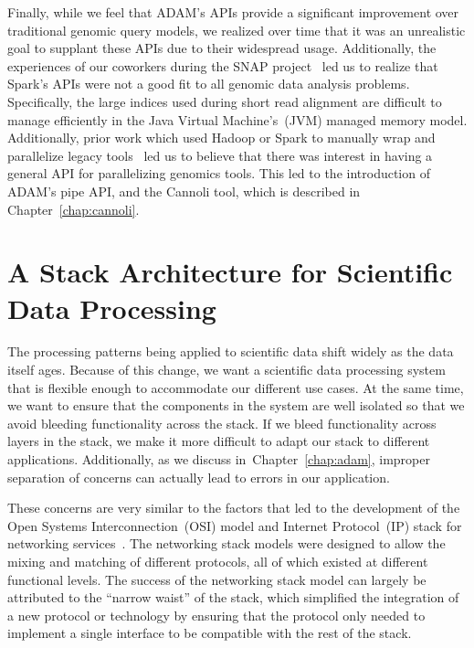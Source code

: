 \documentclass[phd]{ucbthesis}
\begin{document}
Finally, while we feel that {ADAM}'s APIs provide a significant
improvement over traditional genomic query models, we realized over time that it
was an unrealistic goal to supplant these APIs due to their widespread usage.
Additionally, the experiences of our coworkers during the {SNAP}
project~\cite{zaharia11} led us to realize that {Spark}'s APIs were not
a good fit to all genomic data analysis problems. Specifically, the large
indices used during short read alignment are difficult to manage efficiently in
the Java Virtual Machine's~(JVM) managed memory model. Additionally, prior
work which used {Hadoop} or {Spark} to manually wrap and
parallelize legacy tools~\cite{schatz09, langmead09crossbow, abuin15, abuin16,
  chen15, chen16} led us to believe that there was interest in having a general
API for parallelizing genomics tools. This led to the introduction of ADAM's
{pipe} API, and the {Cannoli} tool, which is described in
Chapter~\ref{chap:cannoli}.

\section{A Stack Architecture for Scientific Data Processing}
\label{sec:stack-architecture}

The processing patterns being applied to scientific data shift widely as the data itself ages. Because of
this change, we want a scientific data processing system that is flexible enough to
accommodate our different use cases. At the same time, we want to ensure that the components in the
system are well isolated so that we avoid bleeding functionality across the stack. If we bleed functionality
across layers in the stack, we make it more difficult to adapt our stack to different applications.
Additionally, as we discuss in~Chapter~\ref{chap:adam}, improper separation of concerns can
actually lead to errors in our application.

These concerns are very similar to the factors that led to the development of the Open Systems
Interconnection~(OSI) model and Internet Protocol~(IP) stack for networking
services~\cite{zimmermann80}. The networking stack models were designed to allow the mixing and
matching of different protocols, all of which existed at different functional levels. The success of the
networking stack model can largely be attributed to the ``narrow waist'' of the stack, which simplified the
integration of a new protocol or technology by ensuring that the protocol only needed to implement a
single interface to be compatible with the rest of the stack.
\end{document}
